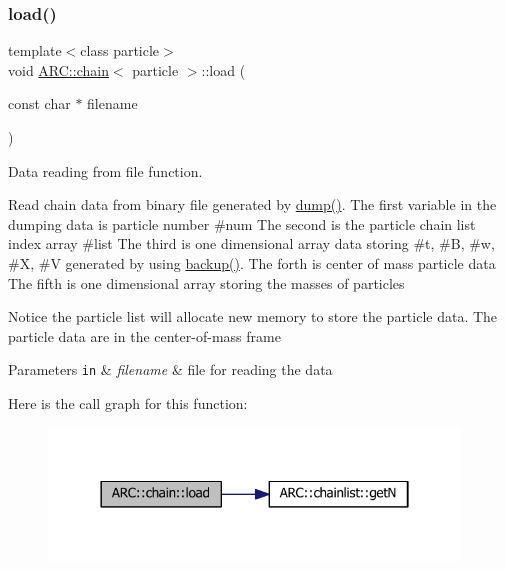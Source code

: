 \subsubsection{\texorpdfstring{load()}{load()}}
{\footnotesize\ttfamily template$<$class particle$>$ \\
void \hyperlink{classARC_1_1chain}{A\+R\+C\+::chain}$<$ particle $>$\+::load (\begin{DoxyParamCaption}\item[{const char $\ast$}]{filename }\end{DoxyParamCaption})\hspace{0.3cm}{\ttfamily [inline]}}



Data reading from file function. 

Read chain data from binary file generated by \hyperlink{classARC_1_1chain_adefda13efa8a0a22e4597600ea1bc193}{dump()}. The first variable in the dumping data is particle number \#num The second is the particle chain list index array \#list The third is one dimensional array data storing \#t, \#B, \#w, \#X, \#V generated by using \hyperlink{classARC_1_1chain_a587009b6c6db0490c0f335aba732d77a}{backup()}. The forth is center of mass particle data The fifth is one dimensional array storing the masses of particles

Notice the particle list will allocate new memory to store the particle data. The particle data are in the center-\/of-\/mass frame 
\begin{DoxyParams}[1]{Parameters}
\mbox{\tt in}  & {\em filename} & file for reading the data \\
\hline
\end{DoxyParams}
Here is the call graph for this function\+:
\nopagebreak
\begin{figure}[H]
\begin{center}
\leavevmode
\includegraphics[width=310pt]{classARC_1_1chain_aed5f04b05a5875cd9a8b45da8fdfa28c_cgraph}
\end{center}
\end{figure}
\hypertarget{classARC_1_1chain_a1aa25daeab4aa0fb3878f1da0620f699}{}\label{classARC_1_1chain_a1aa25daeab4aa0fb3878f1da0620f699} 
